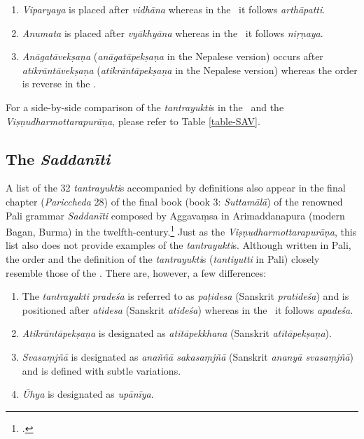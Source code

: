 \begin{enumerate}

	\item \emph{Viparyaya} is placed after \emph{vidhāna} whereas in the \SS\  it 
	follows \emph{arthāpatti}.
	
	\item \emph{Anumata} is placed after \emph{vyākhyāna} whereas in the \SS\ 
it  
	follows \emph{niṛṇaya}.

	\item \emph{Anāgatāvekṣaṇa} (\emph{anāgatāpekṣaṇa} in the Nepalese 
	version) occurs after \emph{atikrāntāvekṣaṇa} (\emph{atikrāntāpekṣaṇa} in 
the 
	Nepalese version) whereas the order is reverse in the \SS.
	
\end{enumerate}

For a side-by-side comparison of the \emph{tantrayukti}s in the \SS\  and the 
\emph{Viṣṇudharmottarapurāṇa}, please refer to Table \ref{table-SAV}.


\subsection{The \emph{Saddanīti}}
A list of the 32 \emph{tantrayukti}s accompanied by definitions also appear in 
the final chapter (\emph{Pariccheda} 28) of the final book (book 3: 
\emph{Suttamālā}) of the renowned Pali grammar \emph{Saddanīti} composed 
by 
Aggavaṃsa in Arimaddanapura (modern Bagan, Burma) in the 
twelfth-century.\footnote{\cite[920--921]{smit-1930}.} Just as the 
\emph{Viṣṇudharmottarapurāṇa}, this list also does not provide examples of the 
\emph{tantrayukti}s. Although written in Pali, the order and the definition of the 
\emph{tantrayukti}s (\emph{tantiyutti} in Pali) closely resemble those of the 
\SS. 
There are, however, a few differences:

	\begin{enumerate}

\item The \emph{tantrayukti} \emph{pradeśa} is referred to as 
\emph{paṭidesa} (Sanskrit \emph{pratideśa}) and is positioned after 
\emph{atidesa} (Sanskrit \emph{atideśa}) whereas in the \SS\ it follows 
\emph{apadeśa}. 

\item \emph{Atikrāntāpekṣaṇa} is designated as \emph{atītāpekkhana} 
(Sanskrit \emph{atītāpekṣaṇa}).

\item \emph{Svasaṃjñā} is designated as \emph{anaññā sakasaṃjñā} (Sanskrit 
\emph{ananyā svasaṃjñā}) and is defined with subtle variations.

\item \emph{Ūhya} is designated as \emph{upānīya}. 
	
	\end{enumerate}

